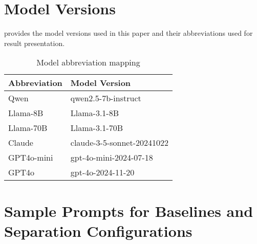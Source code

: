 \section{Model Versions} \label{app:model-mapping}

 provides the model versions used in this paper and their abbreviations used for result presentation.

\begin{table}[h]
\centering
\begin{tabular}{ll}
\toprule
\textbf{Abbreviation} & \textbf{Model Version} \\
\midrule
Qwen & qwen2.5-7b-instruct \\
Llama-8B & Llama-3.1-8B \\
Llama-70B & Llama-3.1-70B \\
Claude & claude-3-5-sonnet-20241022 \\
GPT4o-mini & gpt-4o-mini-2024-07-18 \\
GPT4o & gpt-4o-2024-11-20 \\
\bottomrule
\end{tabular}
\caption{Model abbreviation mapping}
\label{tab:model-mapping}
\end{table}

\clearpage
\section{Sample Prompts for Baselines and Separation Configurations} \label{app:example_prompt_sep}

